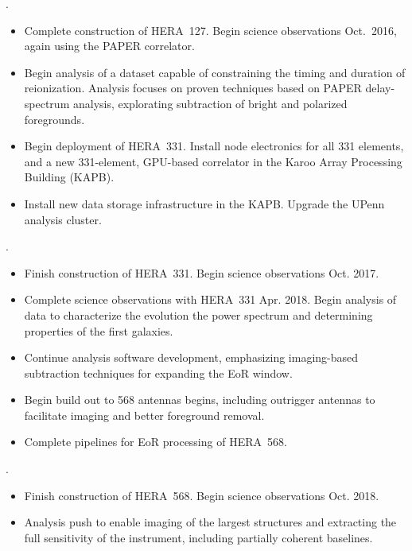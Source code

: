 \documentclass[preprint]{aastex}
\begin{document}
.
\begin{itemize}\setlength{\parskip}{0pt}\itemsep0pt
\vspace{-7pt}
  \item Complete construction of HERA~127. Begin science observations Oct.\ 2016, again using the PAPER correlator.
  \item Begin analysis of a dataset capable of constraining the timing and duration of reionization. 
Analysis focuses on proven techniques based on PAPER delay-spectrum analysis, explorating subtraction of bright 
and polarized foregrounds.
  \item Begin deployment of HERA~331. Install node electronics for all 331 elements, and a new 331-element, 
GPU-based correlator in the Karoo Array Processing Building (KAPB).
  \item  Install new data storage infrastructure in the KAPB.  
Upgrade the UPenn analysis cluster.
\end{itemize}

.
\begin{itemize}\setlength{\parskip}{0pt}\itemsep0pt
\vspace{-7pt}
  \item Finish construction of HERA~331. Begin science observations Oct. 2017.
  \item Complete science observations with HERA~331 Apr. 2018. Begin analysis of data to
characterize the evolution the power spectrum and determining properties of the first galaxies.
  \item Continue analysis software development, emphasizing imaging-based subtraction techniques for expanding the EoR window.
  \item Begin build out to 568 antennas begins, including outrigger antennas to facilitate imaging and better foreground removal.
  \item Complete pipelines for EoR processing of HERA~568.
\end{itemize}

.
\begin{itemize}\setlength{\parskip}{0pt}\itemsep0pt
\vspace{-7pt}
  \item Finish construction of HERA~568. Begin science observations Oct. 2018.
  \item Analysis push to enable imaging of the largest structures and extracting the full sensitivity of 
the instrument, including partially coherent baselines. 
\end{itemize}
\end{document}
